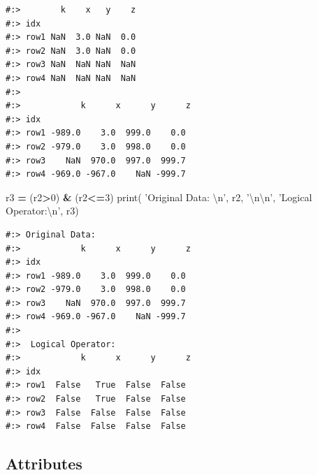 \documentclass[
]{book}
\newenvironment{Shaded}{\begin{snugshade}}{\end{snugshade}}
\newcommand{\BuiltInTok}[1]{#1}
\newcommand{\CharTok}[1]{\textcolor[rgb]{0.5,0.5,0.5}{#1}}
\newcommand{\DecValTok}[1]{\textcolor[rgb]{0.06,0.06,0.06}{#1}}
\newcommand{\NormalTok}[1]{#1}
\newcommand{\OperatorTok}[1]{\textcolor[rgb]{0.43,0.43,0.43}{\textbf{#1}}}
\newcommand{\StringTok}[1]{\textcolor[rgb]{0.5,0.5,0.5}{#1}}
\begin{document}
\begin{verbatim}
#:>        k    x   y    z
#:> idx                   
#:> row1 NaN  3.0 NaN  0.0
#:> row2 NaN  3.0 NaN  0.0
#:> row3 NaN  NaN NaN  NaN
#:> row4 NaN  NaN NaN  NaN 
#:> 
#:>            k      x      y      z
#:> idx                             
#:> row1 -989.0    3.0  999.0    0.0
#:> row2 -979.0    3.0  998.0    0.0
#:> row3    NaN  970.0  997.0  999.7
#:> row4 -969.0 -967.0    NaN -999.7
\end{verbatim}

\begin{Shaded}
\begin{Highlighting}[]
\NormalTok{r3 }\OperatorTok{=}\NormalTok{ (r2}\OperatorTok{>}\DecValTok{0}\NormalTok{) }\OperatorTok{&}\NormalTok{ (r2}\OperatorTok{<=}\DecValTok{3}\NormalTok{)}
\BuiltInTok{print}\NormalTok{( }\StringTok{'Original Data: }\CharTok{\textbackslash{}n}\StringTok{'}\NormalTok{, r2, }\StringTok{'}\CharTok{\textbackslash{}n\textbackslash{}n}\StringTok{'}\NormalTok{,}
       \StringTok{'Logical Operator:}\CharTok{\textbackslash{}n}\StringTok{'}\NormalTok{, r3)}
\end{Highlighting}
\end{Shaded}

\begin{verbatim}
#:> Original Data: 
#:>            k      x      y      z
#:> idx                             
#:> row1 -989.0    3.0  999.0    0.0
#:> row2 -979.0    3.0  998.0    0.0
#:> row3    NaN  970.0  997.0  999.7
#:> row4 -969.0 -967.0    NaN -999.7 
#:> 
#:>  Logical Operator:
#:>            k      x      y      z
#:> idx                             
#:> row1  False   True  False  False
#:> row2  False   True  False  False
#:> row3  False  False  False  False
#:> row4  False  False  False  False
\end{verbatim}

\hypertarget{attributes-6}{%
\subsection{Attributes}\label{attributes-6}}
\end{document}

